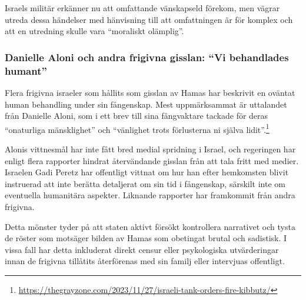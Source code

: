 Israels militär erkänner nu att omfattande vänskapseld förekom, men vägrar utreda dessa händelser med hänvisning till att omfattningen är för komplex och att en utredning skulle vara “moraliskt olämplig”.

\subsubsection*{Danielle Aloni och andra frigivna gisslan: “Vi behandlades humant”}

Flera frigivna israeler som hållits som gisslan av Hamas har beskrivit en oväntat human behandling under sin fångenskap. Mest uppmärksammat är uttalandet från Danielle Aloni, som i ett brev till sina fångvaktare tackade för deras “onaturliga mänsklighet” och “vänlighet trots förlusterna ni själva lidit”.\footnote{\url{https://thegrayzone.com/2023/11/27/israeli-tank-orders-fire-kibbutz/}}

Alonis vittnesmål har inte fått bred medial spridning i Israel, och regeringen har enligt flera rapporter hindrat återvändande gisslan från att tala fritt med medier. Israelen Gadi Peretz har offentligt vittnat om hur han efter hemkomsten blivit instruerad att inte berätta detaljerat om sin tid i fångenskap, särskilt inte om eventuella humanitära aspekter. Liknande rapporter har framkommit från andra frigivna.

Detta mönster tyder på att staten aktivt försökt kontrollera narrativet och tysta de röster som motsäger bilden av Hamas som obetingat brutal och sadistisk. I vissa fall har detta inkluderat direkt censur eller psykologiska utvärderingar innan de frigivna tillåtits återförenas med sin familj eller intervjuas offentligt.

